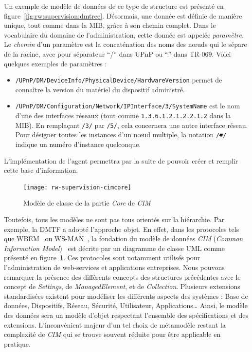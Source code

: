 Un exemple de modèle de données de ce type de structure est présenté en figure~\ref{fig:rw:supervision:dmtree}. Désormais, une donnée est définie de manière unique, tout comme dans la MIB, grâce à son chemin complet. Dans le vocabulaire du domaine de l'administration, cette donnée est appelée \textit{paramètre}. Le \textit{chemin} d'un paramètre est la concaténation des noms des nœuds qui le sépare de la racine, avec pour séparateur \enquote{/} dans UPnP ou \enquote{.} dans TR-069. Voici quelques exemples de paramètres :
\begin{itemize}
\item \verb|/UPnP/DM/DeviceInfo/PhysicalDevice/HardwareVersion| permet de connaître la version du matériel du dispositif administré. 
\item \verb|/UPnP/DM/Configuration/Network/IPInterface/3/SystemName| est le nom d'une des interfaces réseaux (tout comme \verb|1.3.6.1.2.1.2.2.1.2| dans la MIB). En remplaçant \verb|/3/| par \verb|/5/|, cela concernera une autre interface réseau. Pour désigner toutes les instances d'un nœud multiple, la notation \verb|/#/| indique un numéro d'instance quelconque.
\end{itemize}

L'implémentation de l'agent permettra par la suite de pouvoir créer et remplir cette base d'information.

\begin{figure}[ht]
    \centering
    \texttt{[image: rw-supervision-cimcore]}
    \caption{Modèle de classe de la partie \textit{Core} de \textit{CIM}}\label{fig:rw:supervision:cimcore}
\end{figure}
Toutefois, tous les modèles ne sont pas tous orientés sur la hiérarchie. Par exemple, la DMTF a adopté l'approche objet. En effet, dans les protocoles tels que WBEM~\cite{DMTF:WBEM} ou WS-MAN~\cite{DMTF:WS-MAN}, la fondation du modèle de données \textit{CIM} (\textit{Common Information Model})~\cite{DMTF:CIM} est décrite par un diagramme de classe UML comme présenté en figure~\ref{fig:rw:supervision:cimcore}. Ces protocoles sont notamment utilisés pour l'administration de web-services et applications entreprises. Nous pouvons remarquer la présence des différents concepts des structures précédentes avec le concept de \textit{Settings}, de \textit{ManagedElement}, et de \textit{Collection}. Plusieurs extensions standardisées existent pour modéliser les différents aspects des systèmes : Base de données, Dispositifs, Réseau, Sécurité, Utilisateur, Applications\dots{} Ainsi, le modèle des données sera un modèle d'objet respectant l'ensemble des spécifications et des extensions. L'inconvénient majeur d'un tel choix de métamodèle restant la complexité de \textit{CIM} qui se trouve souvent réduite pour être applicable en pratique.

